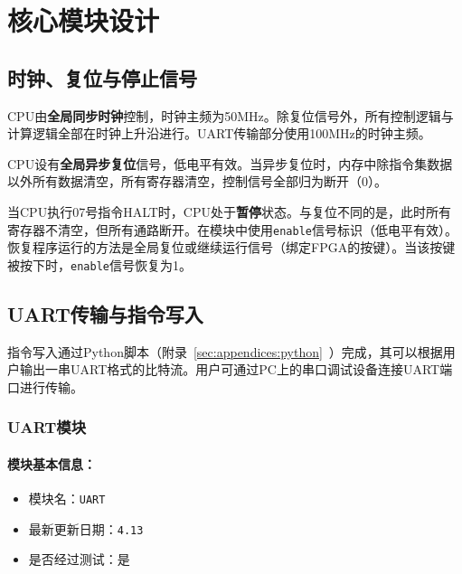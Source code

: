 \documentclass[lang=cn,a4paper,newtx]{elegantpaper}
\begin{document}
\begin{figure}[htbp]
\end{figure}


\section{核心模块设计}
\subsection{时钟、复位与停止信号}
CPU由\textbf{全局同步时钟}控制，时钟主频为50MHz。除复位信号外，所有控制逻辑与计算逻辑全部在时钟上升沿进行。UART传输部分使用100MHz的时钟主频。

CPU设有\textbf{全局异步复位}信号，低电平有效。当异步复位时，内存中除指令集数据以外所有数据清空，所有寄存器清空，控制信号全部归为断开（0）。

当CPU执行07号指令HALT时，CPU处于\textbf{暂停}状态。与复位不同的是，此时所有寄存器不清空，但所有通路断开。在模块中使用\texttt{enable}信号标识（低电平有效）。恢复程序运行的方法是全局复位或继续运行信号（绑定FPGA的按键）。当该按键被按下时，\texttt{enable}信号恢复为1。
\subsection{UART传输与指令写入}
指令写入通过Python脚本（附录~\ref{sec:appendices:python}~）完成，其可以根据用户输出一串UART格式的比特流。用户可通过PC上的串口调试设备连接UART端口进行传输。

\subsubsection{UART模块}
\paragraph{模块基本信息：}
\begin{itemize}
  \item 模块名：\texttt{UART}
  \item 最新更新日期：\texttt{4.13}
  \item 是否经过测试：是
\end{itemize}
\end{document}
